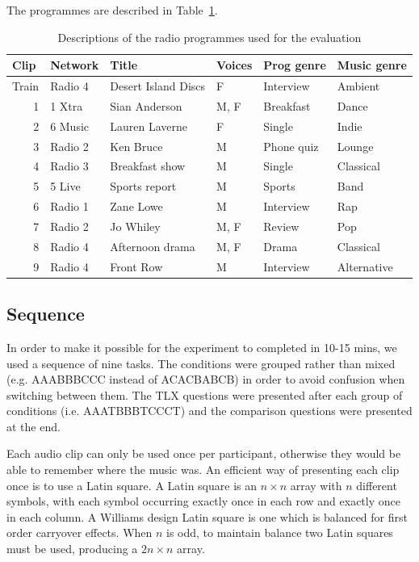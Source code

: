 The programmes are described in Table~\ref{tab:clips}.

\begin{table}[htbp]
  \begin{center}
    {\small
    \begin{tabular}{|r|l|l|l|l|l|}
      \hline
      \multicolumn{1}{|l|}{\textbf{Clip}} & \textbf{Network} & \textbf{Title} &
      \textbf{Voices} & \textbf{Prog genre} & \textbf{Music genre} \\ \hline
      Train & Radio 4 & Desert Island Discs & F & Interview & Ambient \\ \hline
      1 & 1 Xtra & Sian Anderson & M, F & Breakfast & Dance \\ \hline
      2 & 6 Music & Lauren Laverne & F & Single & Indie \\ \hline
      3 & Radio 2 & Ken Bruce & M & Phone quiz & Lounge \\ \hline
      4 & Radio 3 & Breakfast show & M & Single & Classical \\ \hline
      5 & 5 Live & Sports report & M & Sports & Band \\ \hline
      6 & Radio 1 & Zane Lowe & M & Interview & Rap \\ \hline
      7 & Radio 2 & Jo Whiley & M, F & Review & Pop \\ \hline
      8 & Radio 4 & Afternoon drama & M, F & Drama & Classical \\ \hline
      9 & Radio 4 & Front Row & M & Interview & Alternative \\ \hline
    \end{tabular}
    }
  \end{center}
  \caption{Descriptions of the radio programmes used for the evaluation}
  \label{tab:clips}
\end{table}

\subsection{Sequence}\label{sec:studysequence}
In order to make it possible for the experiment to completed in 10-15 mins, we used a sequence of nine tasks. The
conditions were grouped rather than mixed (e.g. AAABBBCCC instead of ACACBABCB) in order to avoid confusion when
switching between them. The TLX questions were presented after each group of conditions (i.e. AAATBBBTCCCT) and the
comparison questions were presented at the end.

Each audio clip can only be used once per participant, otherwise they would be able to remember where the music was. An
efficient way of presenting each clip once is to use a Latin square. A Latin square is an $n \times n$ array with $n$
different symbols, with each symbol occurring exactly once in each row and exactly once in each column. A Williams
design Latin square \citep{Williams1949} is one which is balanced for first order carryover effects.  When $n$ is odd,
to maintain balance two Latin squares must be used, producing a $2n \times n$ array.

